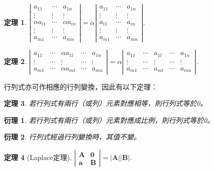 \documentclass[12pt]{article}
\newtheorem*{theorem}{定理}
\newtheorem*{corollary}{衍理}
\begin{document}
    \begin{theorem}
        $\left|\begin{matrix}
            a_{11}&\cdots&a_{1n}\\\vdots&\vdots&\vdots\\\alpha a_{i1}&\cdots&\alpha a_{in}\\\vdots&\vdots&\vdots\\a_{m1}&\cdots&a_{mn}
        \end{matrix}\right|=\alpha\left|\begin{matrix}
            a_{11}&\cdots&a_{1n}\\\vdots&\vdots&\vdots\\a_{i1}&\cdots&a_{in}\\\vdots&\vdots&\vdots\\a_{m1}&\cdots&a_{mn}
        \end{matrix}\right|$.
    \end{theorem}
    
    \begin{theorem}
        $\left|\begin{matrix}
            a_{11}&\cdots&\alpha a_{1l}&\cdots&a_{1n}\\\vdots&\cdots&\vdots&\cdots&\vdots\\a_{m1}&\cdots&\alpha a_{ml}&\cdots&a_{mn}
        \end{matrix}\right|=\alpha\left|\begin{matrix}
            a_{11}&\cdots&a_{1l}&\cdots&a_{1n}\\\vdots&\cdots&\vdots&\cdots&\vdots\\a_{m1}&\cdots&a_{ml}&\cdots&a_{mn}
        \end{matrix}\right|$.
    \end{theorem}

    行列式亦可作相應的行列變換，因此有以下定理：

    \begin{theorem}
        若行列式有兩行（或列）元素對應相等，則行列式等於0。
    \end{theorem}

    \begin{corollary}
        若行列式有兩行（或列）元素對應成比例，則行列式等於0。
    \end{corollary}

    \begin{corollary}
        行列式經過行列變換時，其值不變。
    \end{corollary}

    \begin{theorem}[Laplace定理]
        $\left|\begin{matrix}
            \mathbf{A}&\mathbf{0}\\\mathbf{a}&\mathbf{B}
        \end{matrix}\right|=|\mathbf{A}||\mathbf{B}|$.
    \end{theorem}
    
\end{document}
